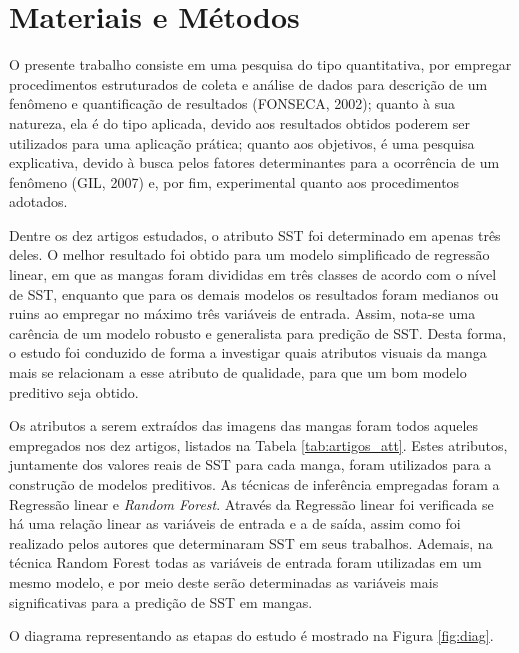 \chapter{Materiais e Métodos} \label{ch:MM} %

O presente trabalho consiste em uma pesquisa do tipo quantitativa, por empregar procedimentos estruturados de coleta e análise de dados para descrição de um fenômeno e quantificação de resultados (FONSECA, 2002); quanto à sua natureza, ela é do tipo aplicada, devido aos resultados obtidos poderem ser utilizados para uma aplicação prática; quanto aos objetivos, é uma pesquisa explicativa, devido à busca pelos fatores determinantes para a ocorrência de um fenômeno (GIL, 2007) e, por fim, experimental quanto aos procedimentos adotados. 

Dentre os dez artigos estudados, o atributo SST foi determinado em apenas três deles. O melhor resultado foi obtido para um modelo simplificado de regressão linear, em que as mangas foram divididas em três classes de acordo com o nível de SST, enquanto que para os demais modelos os resultados foram medianos ou ruins ao empregar no máximo três variáveis de entrada. Assim, nota-se uma carência de um modelo robusto e generalista para predição de SST. Desta forma, o estudo foi conduzido de forma a investigar quais atributos visuais da manga mais se relacionam a esse atributo de qualidade, para que um bom modelo preditivo seja obtido.

Os atributos a serem extraídos das imagens das mangas foram todos aqueles empregados nos dez artigos, listados na Tabela \ref{tab:artigos_att}. Estes atributos, juntamente dos valores reais de SST para cada manga, foram utilizados para a construção de modelos preditivos. As técnicas de inferência empregadas foram a Regressão linear e \textit{Random Forest}. Através da Regressão linear foi verificada se há uma relação linear as variáveis de entrada e a de saída, assim como foi realizado pelos autores que determinaram SST em seus trabalhos. Ademais, na técnica Random Forest todas as variáveis de entrada foram utilizadas em um mesmo modelo, e por meio deste serão determinadas as variáveis mais significativas para a predição de SST em mangas. 

O diagrama representando as etapas do estudo é mostrado na Figura \ref{fig:diag}.

